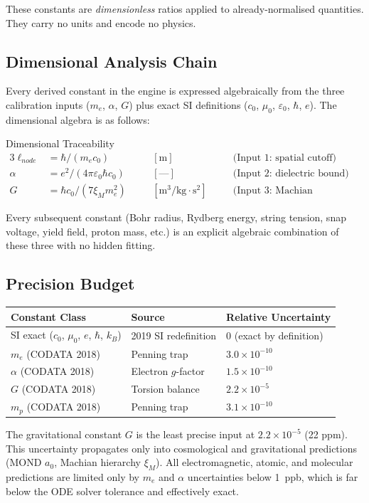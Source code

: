 These constants are \emph{dimensionless} ratios applied to already-normalised quantities.  They carry no units and encode no physics.

\subsection{Dimensional Analysis Chain}
Every derived constant in the engine is expressed algebraically from the three calibration inputs ($m_e$, $\alpha$, $G$) plus exact SI definitions ($c_0$, $\mu_0$, $\varepsilon_0$, $\hbar$, $e$).  The dimensional algebra is as follows:

\begin{resultbox}{Dimensional Traceability}
\begin{alignat*}{3}
\ell_{node} &= \hbar / (m_e c_0) \quad &&[\text{m}] \quad &&\text{(Input 1: spatial cutoff)} \\
\alpha &= e^2 / (4\pi\varepsilon_0 \hbar c_0) \quad &&[\text{---}] \quad &&\text{(Input 2: dielectric bound)} \\
G &= \hbar c_0 / (7 \xi_M m_e^2) \quad &&[\text{m}^3/\text{kg}\cdot\text{s}^2] \quad &&\text{(Input 3: Machian boundary)}
\end{alignat*}
\end{resultbox}

Every subsequent constant (Bohr radius, Rydberg energy, string tension, snap voltage, yield field, proton mass, etc.) is an explicit algebraic combination of these three with no hidden fitting.

\subsection{Precision Budget}

\begin{center}
\small
\renewcommand{\arraystretch}{1.2}
\begin{tabular}{lll}
\toprule
\textbf{Constant Class} & \textbf{Source} & \textbf{Relative Uncertainty} \\
\midrule
SI exact ($c_0$, $\mu_0$, $e$, $\hbar$, $k_B$) & 2019 SI redefinition & 0 (exact by definition) \\
$m_e$ (CODATA 2018) & Penning trap & $3.0 \times 10^{-10}$ \\
$\alpha$ (CODATA 2018) & Electron $g$-factor & $1.5 \times 10^{-10}$ \\
$G$ (CODATA 2018) & Torsion balance & $2.2 \times 10^{-5}$ \\
$m_p$ (CODATA 2018) & Penning trap & $3.1 \times 10^{-10}$ \\
\bottomrule
\end{tabular}
\end{center}

The gravitational constant $G$ is the least precise input at $2.2 \times 10^{-5}$ (22 ppm).  This uncertainty propagates only into cosmological and gravitational predictions (MOND $a_0$, Machian hierarchy $\xi_M$).  All electromagnetic, atomic, and molecular predictions are limited only by $m_e$ and $\alpha$ uncertainties below 1~ppb, which is far below the ODE solver tolerance and effectively exact.

